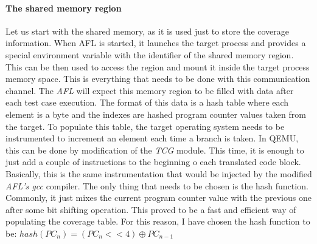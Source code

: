 \paragraph{The shared memory region}
Let us start with the shared memory, as it is used just to store the coverage information. When AFL is started, it launches the target process and provides a special environment variable with the identifier of the shared memory region. This can be then used to access the region and mount it inside the target process memory space. This is everything that needs to be done with this communication channel. The \textit{AFL} will expect this memory region to be filled with data after each test case execution. The format of this data is a hash table where each element is a byte and the indexes are hashed program counter values taken from the target. To populate this table, the target operating system needs to be instrumented to increment an element each time a branch is taken. In QEMU, this can be done by modification of the \textit{TCG} module. This time, it is enough to just add a couple of instructions to the beginning o each translated code block. Basically, this is the same instrumentation that would be injected by the modified \textit{AFL's gcc} compiler. The only thing that needs to be chosen is the hash function. Commonly, it just mixes the current program counter value with the previous one after some bit shifting operation. This proved to be a fast and efficient way of populating the coverage table. For this reason, I have chosen the hash function to be: $hash(PC_n) = (PC_n << 4) \oplus PC_{n-1}$

